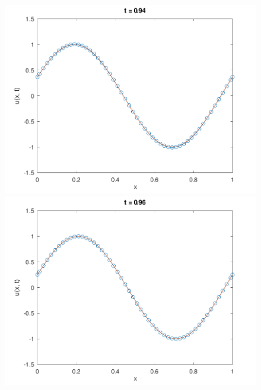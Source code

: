 \documentclass[
	8pt,
	professionalfonts,
	leqno,
	intlimits,
	c,
    aspectratio=1610,
]{beamer}
\begin{document}
\begin{frame}
    \begin{figure}[H]
        \centering
        \includegraphics[width=.4\paperwidth]{../examples/octave/hyperbolic1D47.pdf}
        \includegraphics[width=.4\paperwidth]{../examples/octave/hyperbolic1D48.pdf}


\end{figure}
\end{frame}
\end{document}
